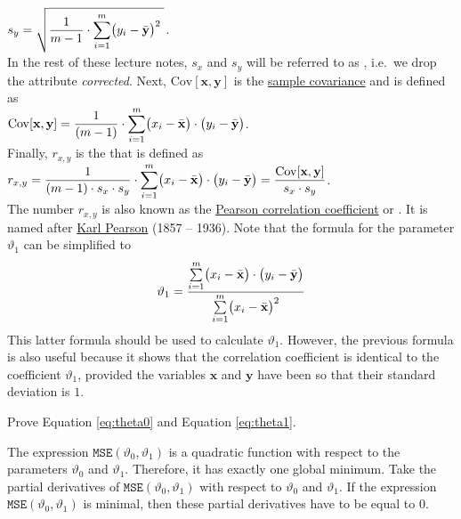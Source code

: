 $\displaystyle s_y = \sqrt{\frac{1}{m-1} \cdot \sum\limits_{i=1}^m \bigl(y_i - \bar{\mathbf{y}}\bigr)^2\;}$.
\\[0.2cm]
In the rest of these lecture notes, $s_x$ and $s_y$ will be referred to as ,
 i.e.~we drop the attribute \emph{corrected}.
Next, $\mathrm{Cov}[\mathbf{x}, \mathbf{y}]$ is the \href{https://en.wikipedia.org/wiki/Sample_mean_and_covariance}{sample covariance}  and is defined as 
\\[0.2cm]
\hspace*{1.3cm}
$\displaystyle \mathrm{Cov}[\mathbf{x}, \mathbf{y}] = \frac{1}{(m-1)} \cdot \sum\limits_{i=1}^m \bigl(x_i - \bar{\mathbf{x}}\bigr) \cdot \bigl(y_i - \bar{\mathbf{y}}\bigr)$.
\\[0.2cm]
Finally, $r_{x,y}$ is the   that is
defined as 
\\[0.2cm]
\hspace*{1.3cm}
$\displaystyle r_{x,y} = \frac{1}{(m-1) \cdot s_x \cdot s_y} \cdot \sum\limits_{i=1}^m \bigl(x_i - \bar{\mathbf{x}}\bigr) \cdot \bigl(y_i - \bar{\mathbf{y}}\bigr)
            = \frac{\mathrm{Cov}[\mathbf{x}, \mathbf{y}]}{s_x \cdot s_y}
$.
\\[0.2cm]
The number $r_{x,y}$ is also known as the
\href{https://en.wikipedia.org/wiki/Pearson_correlation_coefficient}{Pearson correlation coefficient} 
 or 
.  It is named after \href{https://en.wikipedia.org/wiki/Karl_Pearson}{Karl Pearson}
(1857 -- 1936).
Note that the formula for the parameter $\vartheta_1$ can be simplified to  
\begin{equation}
  \label{eq:theta1}
\displaystyle\vartheta_1 = \frac{\sum\limits_{i=1}^m \bigl(x_i - \bar{\mathbf{x}}\bigr) \cdot \bigl(y_i - \bar{\mathbf{y}}\bigr)}{
                        \sum\limits_{i=1}^m \bigl(x_i - \bar{\mathbf{x}}\bigr)^2}  
\end{equation}
This latter formula should be used to calculate $\vartheta_1$.  However, the previous formula is also useful
because it shows that the correlation coefficient is identical to the coefficient $\vartheta_1$, provided the
variables $\mathbf{x}$ and $\mathbf{y}$ have been  so that their standard deviation is $1$.

\exercise
Prove Equation \ref{eq:theta0} and Equation \ref{eq:theta1}.

\hint
The expression $\mathtt{MSE}(\vartheta_0, \vartheta_1)$ is a quadratic function with respect to the parameters
$\vartheta_0$ and $\vartheta_1$.  Therefore, it has exactly one global minimum.  Take the partial derivatives
of $\mathtt{MSE}(\vartheta_0, \vartheta_1)$ with respect to $\vartheta_0$ and $\vartheta_1$.  If the expression
$\mathtt{MSE}(\vartheta_0, \vartheta_1)$ is minimal, then these partial derivatives have to be equal to $0$.
\eox

